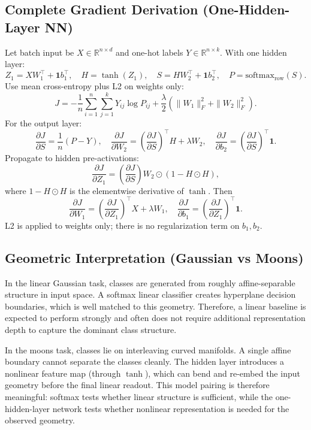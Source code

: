 \documentclass[11pt]{article}
\begin{document}
\subsection{Complete Gradient Derivation (One-Hidden-Layer NN)}
Let batch input be $X\in\mathbb{R}^{n\times d}$ and one-hot labels $Y\in\mathbb{R}^{n\times k}$. With one hidden layer:
\[
Z_1 = XW_1^\top + \mathbf{1}b_1^\top,\quad
H = \tanh(Z_1),\quad
S = HW_2^\top + \mathbf{1}b_2^\top,\quad
P=\mathrm{softmax}_{\text{row}}(S).
\]
Use mean cross-entropy plus L2 on weights only:
\[
J = -\frac{1}{n}\sum_{i=1}^n\sum_{j=1}^k Y_{ij}\log P_{ij}
    + \frac{\lambda}{2}\left(\|W_1\|_F^2+\|W_2\|_F^2\right).
\]
For the output layer:
\[
\frac{\partial J}{\partial S}=\frac{1}{n}(P-Y),
\quad
\frac{\partial J}{\partial W_2}
=\left(\frac{\partial J}{\partial S}\right)^\top H + \lambda W_2,
\quad
\frac{\partial J}{\partial b_2}
=\left(\frac{\partial J}{\partial S}\right)^\top\mathbf{1}.
\]
Propagate to hidden pre-activations:
\[
\frac{\partial J}{\partial Z_1}
=\left(\frac{\partial J}{\partial S}\right)W_2
\odot \left(1-H\odot H\right),
\]
where $1-H\odot H$ is the elementwise derivative of $\tanh$.
Then
\[
\frac{\partial J}{\partial W_1}
=\left(\frac{\partial J}{\partial Z_1}\right)^\top X + \lambda W_1,
\quad
\frac{\partial J}{\partial b_1}
=\left(\frac{\partial J}{\partial Z_1}\right)^\top\mathbf{1}.
\]
L2 is applied to weights only; there is no regularization term on $b_1,b_2$.

\subsection{Geometric Interpretation (Gaussian vs Moons)}
In the linear Gaussian task, classes are generated from roughly affine-separable structure in input space. A softmax linear classifier creates hyperplane decision boundaries, which is well matched to this geometry. Therefore, a linear baseline is expected to perform strongly and often does not require additional representation depth to capture the dominant class structure.

In the moons task, classes lie on interleaving curved manifolds. A single affine boundary cannot separate the classes cleanly. The hidden layer introduces a nonlinear feature map (through $\tanh$), which can bend and re-embed the input geometry before the final linear readout. This model pairing is therefore meaningful: softmax tests whether linear structure is sufficient, while the one-hidden-layer network tests whether nonlinear representation is needed for the observed geometry.
\end{document}
